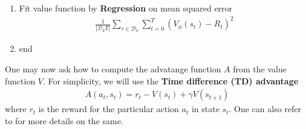 \begin{tcolorbox}[title =PPO Algorithm,breakable]
\begin{enumerate}
\begin{align}
            \rm{clip}\left(\frac{\pi_{\theta}(a|s)}{\pi_{\theta_{\rm{old}}}(a|s)},1+\epsilon,1-\epsilon \right ) A_{\theta_{\rm{old}}}(a,s) \right)\right] 
        \end{align}
        by any optimisation technique (say SGD or Adam)
        \begin{align}
            \theta_k \rightarrow \theta_k + \alpha \grad_{\theta} \mathcal{L}(\theta)
        \end{align}
        \item \null\quad Fit value function by \textbf{Regression} on mean squared error 
        \begin{align}
            \frac{1}{|\mathcal{D}_k T|}\sum_{\tau \in \mathcal{D}_k}\sum^T_{t=0}(V_{\phi}(s_t)-R_{t})^2
        \end{align}
        \item end
    \end{enumerate}
\end{tcolorbox}
One may now ask how to compute the advatange function $A$ from the value function $V$. For simplicity, we will use the \textbf{Time difference (TD) advantage} 
\begin{align}
    A(a_t,s_t) = r_t - V(s_t) +\gamma V(s_{t+1})
\end{align}
where $r_t$ is the reward for the particular action $a_t$ in state $s_t$. One can also refer to \cite{medium_Demystifying_Advantage} for more details on the same.

